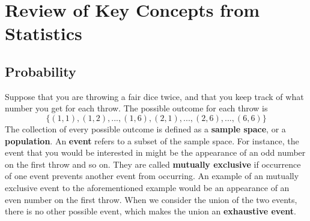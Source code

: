 
\chapter{Review of Key Concepts from Statistics}
\section{Probability}
Suppose that you are throwing a fair dice twice, and that you keep track of what number you get for each throw. The possible outcome for each throw is
\[
\{(1,1),(1,2),...,(1,6),(2,1),...,(2,6),...,(6,6)\}
\]
The collection of every possible outcome is defined as a \textbf{sample space}, or a \textbf{population}. An \textbf{event} refers to a subset of the sample space. For instance, the event that you would be interested in might be the appearance of an odd number on the first throw and so on. They are called \textbf{mutually exclusive} if occurrence of one event prevents another event from occurring. An example of an mutually exclusive event to the aforementioned example would be an appearance of an even number on the first throw. When we consider the union of the two events, there is no other possible event, which makes the union an \textbf{exhaustive event}. \par\medskip\medskip

